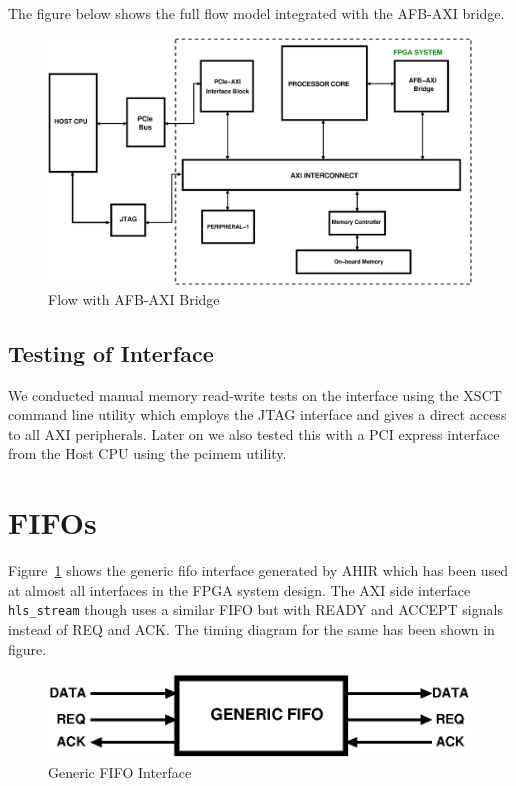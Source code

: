The figure below shows the full flow model integrated with the AFB-AXI bridge.

\begin{figure}[H]
\centering
\includegraphics[width=\textwidth]{eps_pdf_sources/ajit_fpga/AFB_AXI_bridge/AFB_AXI_bridge_integrated}
\caption{Flow with AFB-AXI Bridge}
\end{figure}

\subsection{Testing of Interface}

We conducted manual memory read-write tests on the interface using the XSCT command line utility which employs the JTAG interface and gives
a direct access to all AXI peripherals. Later on we also tested this with a PCI express interface from the Host CPU using the pcimem
utility.

\section{FIFOs }

Figure~\ref{fifo} shows the generic fifo interface generated by AHIR which has been used at almost all interfaces in the FPGA system design.
The AXI side interface \verb|hls_stream| though uses a similar FIFO but with READY and ACCEPT signals instead of REQ and ACK. The timing
diagram for the same has been shown in figure.%

\begin{figure}[H]
\centering
\includegraphics[width=\textwidth]{eps_pdf_sources/ajit_fpga/AFB_AXI_bridge/FIFO}
\caption{Generic FIFO Interface}
\label{fifo}
\end{figure}

